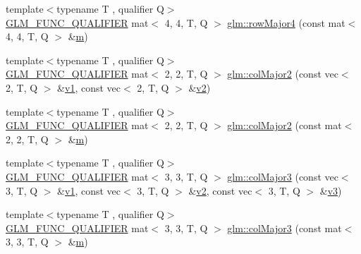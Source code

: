 \begin{DoxyCompactItemize}
\item 
{\footnotesize template$<$typename T , qualifier Q$>$ }\\\hyperlink{setup_8hpp_a33fdea6f91c5f834105f7415e2a64407}{G\+L\+M\+\_\+\+F\+U\+N\+C\+\_\+\+Q\+U\+A\+L\+I\+F\+I\+ER} mat$<$ 4, 4, T, Q $>$ \hyperlink{group__gtx__matrix__major__storage_gac92ad1c2acdf18d3eb7be45a32f9566b}{glm\+::row\+Major4} (const mat$<$ 4, 4, T, Q $>$ \&\hyperlink{_s_d_l__opengl__glext_8h_af593500c283bf1a787a6f947f503a5c2}{m})
\item 
{\footnotesize template$<$typename T , qualifier Q$>$ }\\\hyperlink{setup_8hpp_a33fdea6f91c5f834105f7415e2a64407}{G\+L\+M\+\_\+\+F\+U\+N\+C\+\_\+\+Q\+U\+A\+L\+I\+F\+I\+ER} mat$<$ 2, 2, T, Q $>$ \hyperlink{group__gtx__matrix__major__storage_gaaff72f11286e59a4a88ed21a347f284c}{glm\+::col\+Major2} (const vec$<$ 2, T, Q $>$ \&\hyperlink{_s_d_l__opengl__glext_8h_a435c176a02c061b43e19bdf7c86cceae}{v1}, const vec$<$ 2, T, Q $>$ \&\hyperlink{_s_d_l__opengl__glext_8h_a0928f6d0f0f794ba000a21dfae422136}{v2})
\item 
{\footnotesize template$<$typename T , qualifier Q$>$ }\\\hyperlink{setup_8hpp_a33fdea6f91c5f834105f7415e2a64407}{G\+L\+M\+\_\+\+F\+U\+N\+C\+\_\+\+Q\+U\+A\+L\+I\+F\+I\+ER} mat$<$ 2, 2, T, Q $>$ \hyperlink{group__gtx__matrix__major__storage_gafc25fd44196c92b1397b127aec1281ab}{glm\+::col\+Major2} (const mat$<$ 2, 2, T, Q $>$ \&\hyperlink{_s_d_l__opengl__glext_8h_af593500c283bf1a787a6f947f503a5c2}{m})
\item 
{\footnotesize template$<$typename T , qualifier Q$>$ }\\\hyperlink{setup_8hpp_a33fdea6f91c5f834105f7415e2a64407}{G\+L\+M\+\_\+\+F\+U\+N\+C\+\_\+\+Q\+U\+A\+L\+I\+F\+I\+ER} mat$<$ 3, 3, T, Q $>$ \hyperlink{group__gtx__matrix__major__storage_ga1e25b72b085087740c92f5c70f3b051f}{glm\+::col\+Major3} (const vec$<$ 3, T, Q $>$ \&\hyperlink{_s_d_l__opengl__glext_8h_a435c176a02c061b43e19bdf7c86cceae}{v1}, const vec$<$ 3, T, Q $>$ \&\hyperlink{_s_d_l__opengl__glext_8h_a0928f6d0f0f794ba000a21dfae422136}{v2}, const vec$<$ 3, T, Q $>$ \&\hyperlink{_s_d_l__opengl__glext_8h_acc806b31cbf466ceba6555983d8b814d}{v3})
\item 
{\footnotesize template$<$typename T , qualifier Q$>$ }\\\hyperlink{setup_8hpp_a33fdea6f91c5f834105f7415e2a64407}{G\+L\+M\+\_\+\+F\+U\+N\+C\+\_\+\+Q\+U\+A\+L\+I\+F\+I\+ER} mat$<$ 3, 3, T, Q $>$ \hyperlink{group__gtx__matrix__major__storage_ga86bd0656e787bb7f217607572590af27}{glm\+::col\+Major3} (const mat$<$ 3, 3, T, Q $>$ \&\hyperlink{_s_d_l__opengl__glext_8h_af593500c283bf1a787a6f947f503a5c2}{m})

\end{DoxyCompactItemize}
